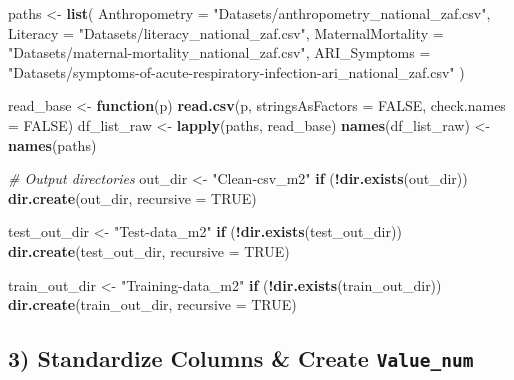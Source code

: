 \documentclass[
]{article}
\newenvironment{Shaded}{\begin{snugshade}}{\end{snugshade}}
\newcommand{\AttributeTok}[1]{\textcolor[rgb]{0.13,0.29,0.53}{#1}}
\newcommand{\CommentTok}[1]{\textcolor[rgb]{0.56,0.35,0.01}{\textit{#1}}}
\newcommand{\ConstantTok}[1]{\textcolor[rgb]{0.56,0.35,0.01}{#1}}
\newcommand{\ControlFlowTok}[1]{\textcolor[rgb]{0.13,0.29,0.53}{\textbf{#1}}}
\newcommand{\FunctionTok}[1]{\textcolor[rgb]{0.13,0.29,0.53}{\textbf{#1}}}
\newcommand{\NormalTok}[1]{#1}
\newcommand{\OtherTok}[1]{\textcolor[rgb]{0.56,0.35,0.01}{#1}}
\newcommand{\SpecialCharTok}[1]{\textcolor[rgb]{0.81,0.36,0.00}{\textbf{#1}}}
\newcommand{\StringTok}[1]{\textcolor[rgb]{0.31,0.60,0.02}{#1}}
\begin{document}
\begin{Shaded}
\begin{Highlighting}[]
\NormalTok{paths }\OtherTok{\textless{}{-}} \FunctionTok{list}\NormalTok{(}
  \AttributeTok{Anthropometry     =} \StringTok{"Datasets/anthropometry\_national\_zaf.csv"}\NormalTok{,}
  \AttributeTok{Literacy          =} \StringTok{"Datasets/literacy\_national\_zaf.csv"}\NormalTok{,}
  \AttributeTok{MaternalMortality =} \StringTok{"Datasets/maternal{-}mortality\_national\_zaf.csv"}\NormalTok{,}
  \AttributeTok{ARI\_Symptoms      =} \StringTok{"Datasets/symptoms{-}of{-}acute{-}respiratory{-}infection{-}ari\_national\_zaf.csv"}
\NormalTok{)}

\NormalTok{read\_base }\OtherTok{\textless{}{-}} \ControlFlowTok{function}\NormalTok{(p) }\FunctionTok{read.csv}\NormalTok{(p, }\AttributeTok{stringsAsFactors =} \ConstantTok{FALSE}\NormalTok{, }\AttributeTok{check.names =} \ConstantTok{FALSE}\NormalTok{)}
\NormalTok{df\_list\_raw }\OtherTok{\textless{}{-}} \FunctionTok{lapply}\NormalTok{(paths, read\_base)}
\FunctionTok{names}\NormalTok{(df\_list\_raw) }\OtherTok{\textless{}{-}} \FunctionTok{names}\NormalTok{(paths)}

\CommentTok{\# Output directories}
\NormalTok{out\_dir }\OtherTok{\textless{}{-}} \StringTok{"Clean{-}csv\_m2"}
\ControlFlowTok{if}\NormalTok{ (}\SpecialCharTok{!}\FunctionTok{dir.exists}\NormalTok{(out\_dir)) }\FunctionTok{dir.create}\NormalTok{(out\_dir, }\AttributeTok{recursive =} \ConstantTok{TRUE}\NormalTok{)}

\NormalTok{test\_out\_dir }\OtherTok{\textless{}{-}} \StringTok{"Test{-}data\_m2"}
\ControlFlowTok{if}\NormalTok{ (}\SpecialCharTok{!}\FunctionTok{dir.exists}\NormalTok{(test\_out\_dir)) }\FunctionTok{dir.create}\NormalTok{(test\_out\_dir, }\AttributeTok{recursive =} \ConstantTok{TRUE}\NormalTok{)}

\NormalTok{train\_out\_dir }\OtherTok{\textless{}{-}} \StringTok{"Training{-}data\_m2"}
\ControlFlowTok{if}\NormalTok{ (}\SpecialCharTok{!}\FunctionTok{dir.exists}\NormalTok{(train\_out\_dir)) }\FunctionTok{dir.create}\NormalTok{(train\_out\_dir, }\AttributeTok{recursive =} \ConstantTok{TRUE}\NormalTok{)}
\end{Highlighting}
\end{Shaded}

\subsection{\texorpdfstring{3) Standardize Columns \& Create
\texttt{Value\_num}}{3) Standardize Columns \& Create Value\_num}}\label{standardize-columns-create-value_num}
\end{document}
